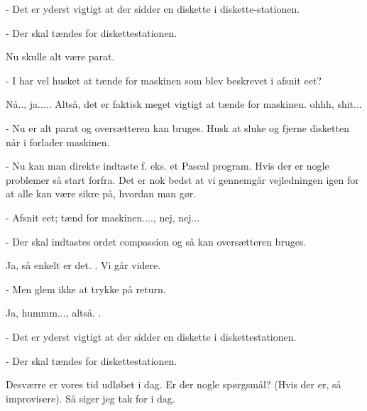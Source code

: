 \documentclass[a4paper,11pt]{article}
\begin{document}
\begin{sketch}
- Det er yderst vigtigt at der sidder en diskette i diskette-stationen.


- Der skal tændes for diskettestationen.

Nu skulle alt være parat.

- I har vel husket at tænde for maskinen som blev beskrevet i afsnit eet?

Nå.., ja..... Altså, det er faktisk meget vigtigt at tænde for
maskinen.  ohhh, shit...

- Nu er alt parat og oversætteren kan bruges. Husk at sluke og fjerne disketten
når i forlader maskinen.


- Nu kan man direkte indtaste f. eks. et Pascal program.  Hvis der er nogle problemer så start forfra.  Det er nok
bedst at vi gennemgår vejledningen igen for at alle kan være sikre på, hvordan
man gør. 

- Afsnit eet; tænd for maskinen...., nej, nej...


- Der skal indtastes ordet compassion og så kan oversætteren bruges.

Ja, så enkelt er det. . Vi går videre.

- Men glem ikke at trykke på return.

Ja, hummm..., altså. .

- Det er yderst vigtigt at der sidder en diskette i diskettestationen.


- Der skal tændes for diskettestationen.

Desværre er vores tid udløbet i dag.  Er der nogle spørgsmål? (Hvis der er,
så improvisere). Så siger jeg tak for i dag. 

\end{sketch}
\end{document}
